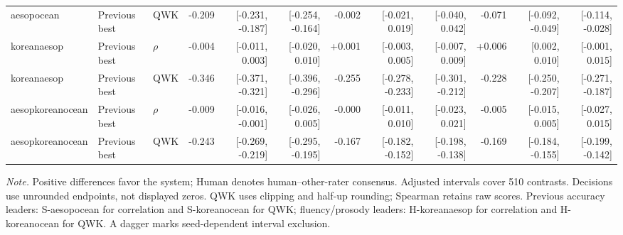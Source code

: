 \begin{landscape}
\begin{longtable}{@{}lllrrrrrrrrr@{}}
aesopocean & Previous best & QWK & -0.209 & [-0.231, -0.187] & [-0.254, -0.164] & -0.002 & [-0.021, 0.019] & [-0.040, 0.042] & -0.071 & [-0.092, -0.049] & [-0.114, -0.028]\\
koreanaesop & Previous best & $\rho$ & -0.004 & [-0.011, 0.003] & [-0.020, 0.010] & +0.001 & [-0.003, 0.005] & [-0.007, 0.009] & +0.006 & [0.002, 0.010] & [-0.001, 0.015]\\
koreanaesop & Previous best & QWK & -0.346 & [-0.371, -0.321] & [-0.396, -0.296] & -0.255 & [-0.278, -0.233] & [-0.301, -0.212] & -0.228 & [-0.250, -0.207] & [-0.271, -0.187]\\
aesopkoreanocean & Previous best & $\rho$ & -0.009 & [-0.016, -0.001] & [-0.026, 0.005] & -0.000 & [-0.011, 0.010] & [-0.023, 0.021] & -0.005 & [-0.015, 0.005] & [-0.027, 0.015]\\
aesopkoreanocean & Previous best & QWK & -0.243 & [-0.269, -0.219] & [-0.295, -0.195] & -0.167 & [-0.182, -0.152] & [-0.198, -0.138] & -0.169 & [-0.184, -0.155] & [-0.199, -0.142]\\
\end{longtable}
\noindent\textit{Note.} Positive differences favor the system; Human denotes human--other-rater consensus. Adjusted intervals cover 510 contrasts. Decisions use unrounded endpoints, not displayed zeros. QWK uses clipping and half-up rounding; Spearman retains raw scores. Previous accuracy leaders: S-aesopocean for correlation and S-koreanocean for QWK; fluency/prosody leaders: H-koreanaesop for correlation and H-koreanocean for QWK. A dagger marks seed-dependent interval exclusion.
\endgroup
\end{landscape}
